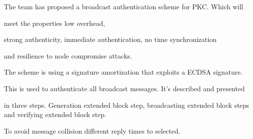 \tiny

The team has proposed a broadcast authentication scheme for PKC. Which will

meet the properties low overhead,

strong authenticity, immediate authentication, no time synchronization

and resilience to node compromise attacks.

The scheme is using a signature amortization that exploits a ECDSA signature.

This is used to authenticate all broadcast messages. It's described and presented

in three steps. Generation extended block step, broadcasting extended block steps and verifying extended block step. 

To avoid message collision different reply times to selected.